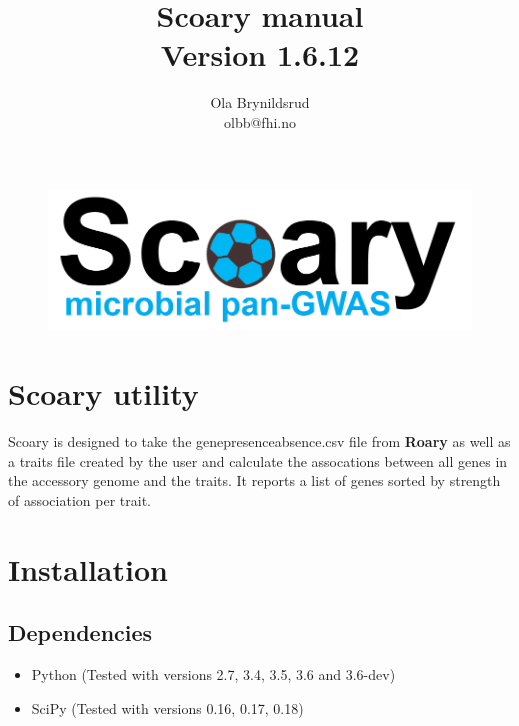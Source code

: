 \documentclass{article}
\title{Scoary manual\\Version 1.6.12}
\date{}
\author{Ola Brynildsrud\\olbb@fhi.no}
\begin{document}

  \maketitle

  \newpage

  \tableofcontents

  \newpage


  \begin{figure}
    \includegraphics[width=\linewidth]{images/scoary_logo.png}
  \end{figure}

  \section{Scoary utility}

  Scoary \cite{brynildsrud2016rapid} is designed to take the gene\textunderscore presence\textunderscore absence.csv file from \textbf{Roary} \cite{page2015roary} as well as a traits file created by the user and calculate the assocations between all genes in the accessory genome and the traits. It reports a list of genes sorted by strength of association per trait.

  \section{Installation}

    \subsection{Dependencies}

    \begin{itemize}

      \item Python (Tested with versions 2.7, 3.4, 3.5, 3.6 and 3.6-dev)
      \item SciPy (Tested with versions 0.16, 0.17, 0.18)

    \end{itemize}
\end{document}
